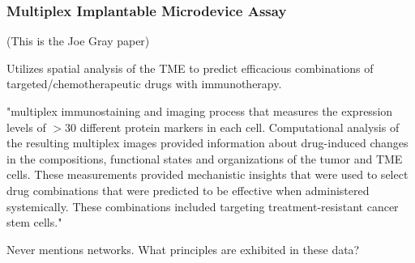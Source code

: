 \documentclass{beamer}
\begin{document}
\begin{frame}
  \frametitle{Multiplex Implantable Microdevice Assay}
  (This is the Joe Gray paper)

  Utilizes spatial analysis of the TME to predict efficacious combinations of targeted/chemotherapeutic drugs with immunotherapy.

  \vfill

  "multiplex immunostaining and imaging process that measures the expression levels of $>30$ different protein markers in each cell. Computational analysis of the resulting multiplex images provided information about drug-induced changes in the compositions, functional states and organizations of the tumor and TME cells. These measurements provided mechanistic insights that were used to select drug combinations that were predicted to be effective when administered systemically. These combinations included targeting treatment-resistant cancer stem cells."
  
  \vfill
  
  Never mentions networks. What principles are exhibited in these data? 
\end{frame}
\end{document}
